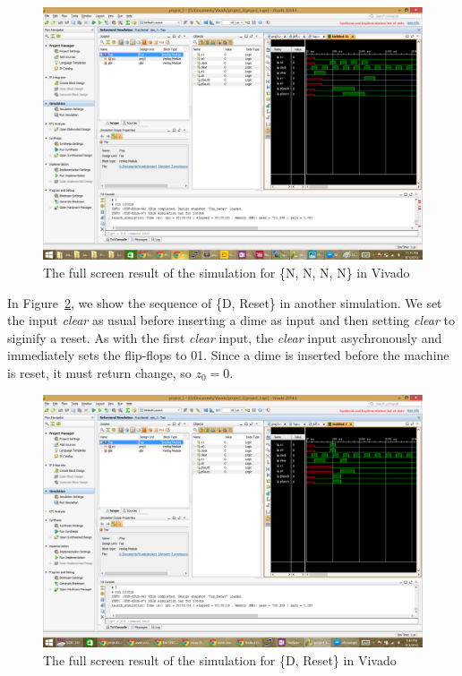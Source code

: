 \documentclass{article}
\begin{document}
\clearpage

\begin{figure}[h!]
\centering
\includegraphics[scale=0.4]{NNNN}
\caption{The full screen result of the simulation for \{N, N, N, N\} in Vivado}
\label{fig:nnnn}
\end{figure}

In Figure~\ref{fig:d_reset}, we show the sequence of \{D, Reset\} in another 
simulation. We set the input \textit{clear} as usual before inserting a dime as 
input and then setting \textit{clear} to siginify a reset. As with the first 
\textit{clear} input, the \textit{clear} input asychronously and immediately 
sets the flip-flops to 01. Since a dime is inserted before the machine is 
reset, it must return change, so $z_0=0$.

\clearpage

\begin{figure}[h!]
\centering
\includegraphics[scale=0.4]{D_Reset}
\caption{The full screen result of the simulation for \{D, Reset\} in Vivado}
\label{fig:d_reset}
\end{figure}
\end{document}
